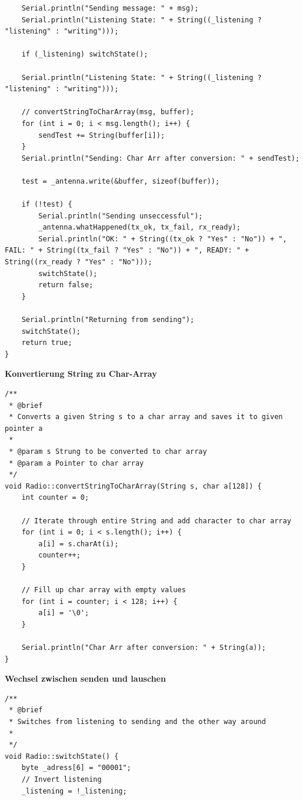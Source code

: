 \documentclass[a4paper, 11pt]{scrartcl}
\begin{document}
\begin{small}
\begin{lstlisting}
    Serial.println("Sending message: " + msg);
    Serial.println("Listening State: " + String((_listening ? "listening" : "writing")));

    if (_listening) switchState();
    
    Serial.println("Listening State: " + String((_listening ? "listening" : "writing")));

    // convertStringToCharArray(msg, buffer);
    for (int i = 0; i < msg.length(); i++) {
        sendTest += String(buffer[i]);
    }
    Serial.println("Sending: Char Arr after conversion: " + sendTest);
    
    test = _antenna.write(&buffer, sizeof(buffer));

    if (!test) {
        Serial.println("Sending unseccessful");
        _antenna.whatHappened(tx_ok, tx_fail, rx_ready);
        Serial.println("OK: " + String((tx_ok ? "Yes" : "No")) + ", FAIL: " + String((tx_fail ? "Yes" : "No")) + ", READY: " + String((rx_ready ? "Yes" : "No")));
        switchState();
        return false;
    }

    Serial.println("Returning from sending");
    switchState();
    return true;
}
\end{lstlisting}

\begin{flushleft}\textbf{Konvertierung String zu Char-Array}\label{code:transpose_s_to_arr}\end{flushleft}
\begin{lstlisting}
/**
 * @brief
 * Converts a given String s to a char array and saves it to given pointer a
 * 
 * @param s Strung to be converted to char array
 * @param a Pointer to char array
 */
void Radio::convertStringToCharArray(String s, char a[128]) {
    int counter = 0;

    // Iterate through entire String and add character to char array
    for (int i = 0; i < s.length(); i++) {
        a[i] = s.charAt(i);
        counter++;
    }

    // Fill up char array with empty values
    for (int i = counter; i < 128; i++) {
        a[i] = '\0';
    }

    Serial.println("Char Arr after conversion: " + String(a));
}
\end{lstlisting}

\begin{flushleft}\textbf{Wechsel zwischen senden und lauschen}\label{code:switch}\end{flushleft}
\begin{lstlisting}
/**
 * @brief 
 * Switches from listening to sending and the other way around
 * 
 */
void Radio::switchState() {
    byte _adress[6] = "00001";
    // Invert listening
    _listening = !_listening;


\end{lstlisting}
\end{small}
\end{document}
